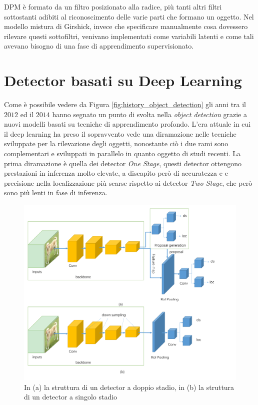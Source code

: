 \ac{DPM} è formato da un filtro posizionato alla radice, più tanti altri filtri sottostanti adibiti al riconoscimento delle varie parti che formano un oggetto. Nel modello mistura di Girshick, invece che specificare manualmente cosa dovessero rilevare questi sottofiltri, venivano implementati come variabili latenti e come tali avevano bisogno di una fase di apprendimento supervisionato. 
\section{Detector basati su Deep Learning}
\label{sec:deep_learning_obj}
Come è possibile vedere da Figura \ref{fig:history_object_detection} gli anni tra il $2012$ ed il $2014$ hanno segnato un punto di svolta nella \textit{object detection} grazie a nuovi modelli basati su tecniche di apprendimento profondo. L'era attuale in cui il deep learning ha preso il sopravvento vede una diramazione nelle tecniche sviluppate per la rilevazione degli oggetti, nonostante ciò i due rami sono complementari e sviluppati in parallelo in quanto oggetto di studi recenti. La prima diramazione è quella dei detector \textit{One Stage}, questi detector ottengono prestazioni in inferenza molto elevate, a discapito però di accuratezza e e precisione nella localizzazione più scarse rispetto ai detector \textit{Two Stage}, che però sono più lenti in fase di inferenza. 
\begin{figure}[]
    \centering
    \includegraphics[width=\textwidth]{images/architectures_one_two_stage.pdf}
    \caption{In (a) la struttura di un detector a doppio stadio, in (b) la struttura di un detector a singolo stadio \cite{DBLP:journals/corr/abs-1907-09408}}
    \label{fig:detector_structure}
\end{figure}

